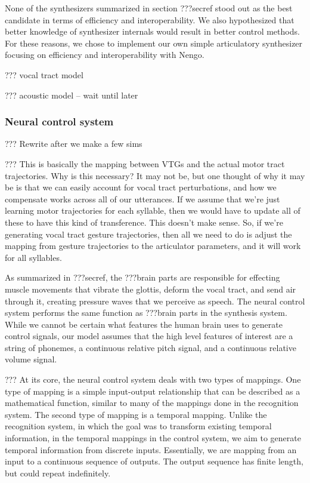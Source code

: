 None of the synthesizers summarized in
section ???secref
stood out as the best candidate
in terms of efficiency and interoperability.
We also hypothesized that better knowledge
of synthesizer internals would
result in better control methods.
For these reasons,
we chose to implement our own
simple articulatory synthesizer focusing on
efficiency and interoperability with Nengo.

??? vocal tract model

??? acoustic model -- wait until later

\subsubsection{Neural control system}

??? Rewrite after we make a few sims

??? This is basically the mapping between VTGs
and the actual motor tract trajectories.
Why is this necessary? It may not be,
but one thought of why it may be
is that we can easily account for
vocal tract perturbations,
and how we compensate works
across all of our utterances.
If we assume that we're just learning
motor trajectories for each syllable,
then we would have to update all of these
to have this kind of transference.
This doesn't make sense.
So, if we're generating vocal tract gesture trajectories,
then all we need to do is
adjust the mapping from gesture trajectories
to the articulator parameters,
and it will work for all syllables.

As summarized in ???secref,
the ???brain parts
are responsible for effecting
muscle movements that
vibrate the glottis,
deform the vocal tract,
and send air through it,
creating pressure waves
that we perceive as speech.
The neural control system
performs the same function as ???brain parts
in the synthesis system.
While we cannot be certain
what features the human brain
uses to generate control signals,
our model assumes that the
high level features of interest
are a string of phonemes,
a continuous relative pitch signal,
and a continuous relative volume signal.

??? At its core, the neural control system
deals with two types of mappings.
One type of mapping is a simple
input-output relationship
that can be described as a mathematical function,
similar to many of the mappings
done in the recognition system.
The second type of mapping is a temporal mapping.
Unlike the recognition system,
in which the goal was to
transform existing temporal information,
in the temporal mappings in the control system,
we aim to generate temporal information
from discrete inputs.
Essentially, we are mapping from
an input to a continuous sequence of outputs.
The output sequence has finite length,
but could repeat indefinitely.

